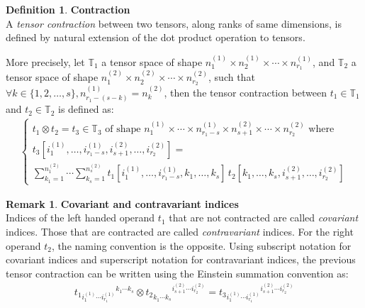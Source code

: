 \documentclass{article}
\theoremstyle{definition}
\newtheorem{definition}{Definition}[section]
\newtheorem{remark}{Remark}
\newcommand{\tspace}{\mathbb{T}}
\begin{document}
\begin{definition}\textbf{Contraction}\\
A \emph{tensor contraction} between two tensors, along ranks of same dimensions, is defined by natural extension of the dot product operation to tensors.

More precisely, let $\tspace_1$ a tensor space of shape $n_1^{(1)} \times n_2^{(1)} \times \cdots \times n_{r_1}^{(1)}$, and $\tspace_2$ a tensor space of shape $n_1^{(2)} \times n_2^{(2)} \times \cdots \times n_{r_2}^{(2)}$, such that $\forall k \in \{1, 2, \ldots, s\}, n_{r_1-(s-k)}^{(1)} = n_k^{(2)}$, then the tensor contraction between $t_1 \in \tspace_1$ and $t_2 \in \tspace_2$ is defined as:
\begin{gather*}
\left\{
  \begin{array}{l}
    t_1 \otimes t_2 = t_3 \in \tspace_3 \text{ of shape } n_1^{(1)} \times \cdots \times n_{r_1-s}^{(1)} \times n_{s+1}^{(2)} \times \cdots \times n_{r_2}^{(2)}
    \text{ where} \\
    t_3[i_1^{(1)}, \ldots, i_{r_1-s}^{(1)}, i_{s+1}^{(2)}, \ldots, i_{r_2}^{(2)}] = \\
    \displaystyle \sum_{k_1=1}^{n_1^{(2)}} \cdots \sum_{k_s=1}^{n_s^{(2)}}
    t_1[i_1^{(1)}, \ldots, i_{r_1-s}^{(1)}, k_1, \ldots, k_s] \hspace{2pt}
    t_2[k_1, \ldots, k_s, i_{s+1}^{(2)}, \ldots, i_{r_2}^{(2)}]
  \end{array}
\right.
\end{gather*}
\end{definition}

\begin{remark}\textbf{Covariant and contravariant indices}\\
Indices of the left handed operand $t_1$ that are not contracted are called \emph{covariant} indices. Those that are contracted are called \emph{contravariant} indices. For the right operand $t_2$, the naming convention is the opposite. Using subscript notation for covariant indices and superscript notation for contravariant indices, the previous tensor contraction can be written using the Einstein summation convention as:
\begin{gather}
t_1 \hspace{0pt}_{i_1^{(1)} \cdots i_{r_1}^{(1)} } \hspace{0pt}^{ k_1 \cdots k_s} \otimes
t_2 \hspace{0pt}_{ k_1^{\phantom{(}} \cdots k_s^{\phantom{(}}} \hspace{0pt}^{i_{s+1}^{(2)} \cdots i_{r_2}^{(2)}} =
t_3 \hspace{0pt}_ {i_1^{(1)} \cdots i_{r_1}^{(1)} } \hspace{0pt}^{i_{s+1}^{(2)} \cdots i_{r_2}^{(2)}}
\end{gather}
\end{remark}
\end{document}
